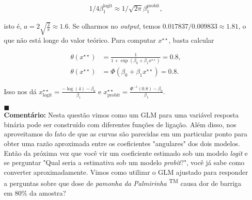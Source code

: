 {{\begin{align*}
    1/4 \beta_1^{\text{logit}} \approx 1/\sqrt{2\pi} \beta_1^{\text{probit}},
\end{align*}

isto é, $a = 2 \sqrt{\frac{2}{\pi}} \approx 1.6$.
Se olharmos no \textit{output}, temos $0.017837/0.009833 \approx 1.81$, o que não está longe do valor teórico.
Para computar $x^{\star \star}$, basta calcular

\begin{align*}
    \theta(x^{\star \star}) &= \frac{1}{1 + \exp(\beta_0 + \beta_1 x^{\star \star})} = 0.8, \\
    \theta(x^{\star \star}) &= \Phi(\beta_0 + \beta_1 x^{\star \star}) = 0.8.
\end{align*}

Isso nos dá $x_{\text{logit}}^{\star \star} = \frac{-\log(4) - \beta_0}{\beta_1}$ e $x_{\text{probit}}^{\star \star} = \frac{\Phi^{-1}(0.8) - \beta_0}{\beta_1}$.

$\blacksquare$\\
\textbf{Comentário:}
Nesta questão vimos como um GLM para uma variável resposta binária pode ser construído com diferentes funções de ligação.
Além disso, nos aproveitamos do fato de que as curvas são parecidas em um particular ponto para obter uma razão aproximada entre os coeficientes "angulares" dos dois modelos.
Então da próxima vez que você vir um coeficiente estimado sob um modelo \textit{logit} e se perguntar "Qual seria a estimativa sob um modelo \textit{probit}?", você já sabe como converter aproximadamente.
Vimos como utilizar o GLM ajustado para responder a perguntas sobre que dose de \textit{pamonha da Palmirinha} \textsuperscript{TM} causa  dor de barriga em  80\% da amostra? 
}
}